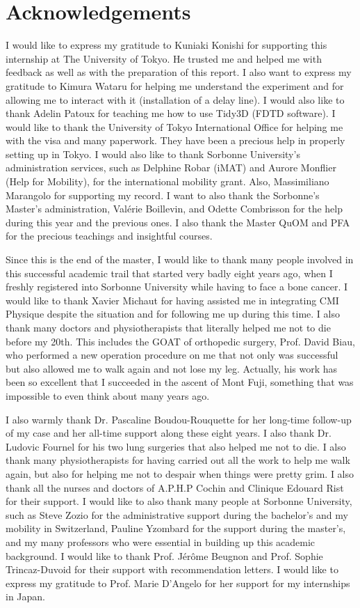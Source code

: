 \documentclass[a4paper,11pt]{article}
\renewcommand{\_}{\textunderscore\allowbreak}
\begin{document}
\section{Acknowledgements}

I would like to express my gratitude to Kuniaki Konishi for supporting this internship at The University of Tokyo. He trusted me and helped me with feedback as well as with the preparation of this report.
I also want to express my gratitude to Kimura Wataru for helping me understand the experiment and for allowing me to interact with it (installation of a delay line). I would also like to thank Adelin Patoux for teaching me how to use Tidy3D (FDTD software). I would like to thank the University of Tokyo International Office for helping me with the visa and many paperwork. They have been a precious help in properly setting up in Tokyo. I would also like to thank Sorbonne University's administration services, such as Delphine Robar (iMAT) and Aurore Monflier (Help for Mobility), for the international mobility grant. Also, Massimiliano Marangolo for supporting my record.
I want to also thank the Sorbonne's Master's administration, Valérie Boillevin, and Odette Combrisson for the help during this year and the previous ones. I also thank the Master QuOM and PFA for the precious teachings and insightful courses.

Since this is the end of the master, I would like to thank many people involved in this successful academic trail that started very badly eight years ago, when I freshly registered into Sorbonne University while having to face a bone cancer. I would like to thank Xavier Michaut for having assisted me in integrating CMI Physique despite the situation and for following me up during this time. I also thank many doctors and physiotherapists that literally helped me not to die before my 20th. This includes the GOAT of orthopedic surgery, Prof. David Biau, who performed a new operation procedure on me that not only was successful but also allowed me to walk again and not lose my leg. Actually, his work has been so excellent that I succeeded in the ascent of Mont Fuji, something that was impossible to even think about many years ago.

I also warmly thank Dr. Pascaline Boudou-Rouquette for her long-time follow-up of my case and her all-time support along these eight years. I also thank Dr. Ludovic Fournel for his two lung surgeries that also helped me not to die.
I also thank many physiotherapists for having carried out all the work to help me walk again, but also for helping me not to despair when things were pretty grim. I also thank all the nurses and doctors of A.P.H.P Cochin and Clinique Edouard Rist for their support.
I would like to also thank many people at Sorbonne University, such as Steve Zozio for the administrative support during the bachelor's and my mobility in Switzerland, Pauline Yzombard for the support during the master's, and my many professors who were essential in building up this academic background. I would like to thank Prof. Jérôme Beugnon and Prof. Sophie Trincaz-Duvoid for their support with recommendation letters. I would like to express my gratitude to Prof. Marie D'Angelo for her support for my internships in Japan.
\end{document}
